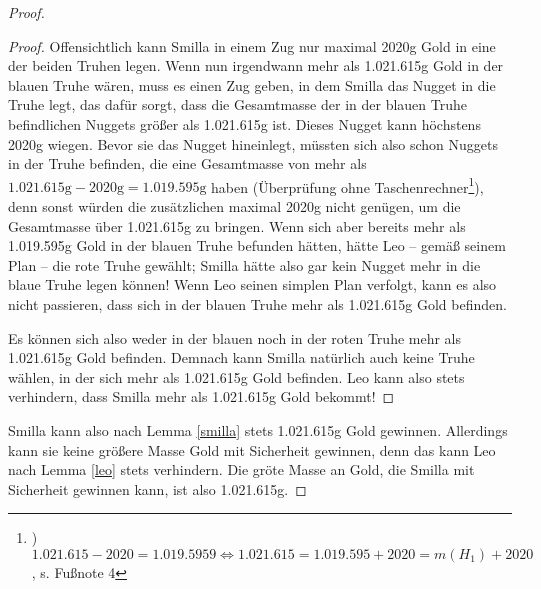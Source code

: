 \begin{proof}
\begin{proof}
        Offensichtlich kann Smilla in einem Zug nur maximal 2020g Gold  in eine der beiden Truhen legen. Wenn nun 
        irgendwann mehr als 1.021.615g Gold in der blauen Truhe wären, muss es einen Zug geben, in dem Smilla das 
        Nugget in die Truhe legt, das dafür sorgt, dass die Gesamtmasse der in der blauen Truhe befindlichen Nuggets 
        größer als 1.021.615g ist. Dieses Nugget kann höchstens 2020g wiegen. Bevor sie das Nugget hineinlegt, 
        müssten sich also schon Nuggets in der Truhe befinden, die eine Gesamtmasse von mehr als $1.021.615\text{g}-
        2020\text{g}=1.019.595\text{g}$ haben (Überprüfung ohne Taschenrechner\footnote{) $1.021.615-2020=
        1.019.5959 \Leftrightarrow 1.021.615=1.019.595+2020=m(H_1)+2020$, s. Fußnote 4}), 
        denn sonst würden die zusätzlichen maximal 2020g nicht genügen, um die Gesamtmasse über 1.021.615g zu 
        bringen. Wenn sich aber bereits mehr als 1.019.595g Gold in der blauen Truhe befunden hätten, hätte Leo -- 
        gemäß seinem Plan -- die rote Truhe gewählt; Smilla hätte also gar kein Nugget mehr in die blaue Truhe 
        legen können! Wenn Leo seinen simplen Plan verfolgt, kann es also nicht passieren, dass sich in der blauen 
        Truhe mehr als 1.021.615g Gold befinden. 

        Es können sich also weder in der blauen noch in der roten Truhe mehr als 1.021.615g Gold befinden. Demnach 
        kann Smilla natürlich auch keine Truhe wählen, in der sich mehr als 1.021.615g Gold befinden. Leo kann also 
        stets verhindern, dass Smilla mehr als 1.021.615g Gold bekommt!
    \end{proof}
    \renewcommand{\qedsymbol}{$\blacksquare$}
    Smilla kann also nach Lemma \ref{smilla} stets 1.021.615g Gold gewinnen. Allerdings kann sie keine größere Masse 
    Gold mit Sicherheit gewinnen, denn das kann Leo nach Lemma \ref{leo} stets verhindern. Die gröte Masse an Gold, 
    die Smilla mit Sicherheit gewinnen kann, ist also 1.021.615g.
\end{proof}